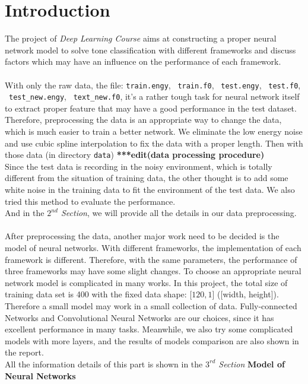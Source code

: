 \documentclass[12pt]{article}
\begin{document}
\section{Introduction}

The project of {\it Deep Learning Course} aims at constructing a proper neural network model to solve tone classification with different frameworks and discuss factors which may have an influence on the performance of each framework.\\
\\
With only the raw data, the file: \texttt{train.engy}, \  \texttt{train.f0}, \ \texttt{test.engy}, \ \texttt{test.f0},  \ \texttt{test\_new.engy}, \ \texttt{text\_new.f0}, it's a rather tough task for neural network itself to extract proper feature that may have a good performance in the test dataset. Therefore, preprocessing the data  is an appropriate way to change the data, which is much easier to train a better network. We eliminate the low energy noise and use cubic spline interpolation to fix the data with a proper length. Then with those data (in directory \texttt{data}) {\bf ****edit(data processing procedure)}\\
Since the test data is recording in the noisy environment, which is totally different from the situation of training data, the other thought is to add some white noise in the training data to fit the environment of the test data. We also tried this method to evaluate the performance.\\
And in the {\it $2^{nd}$ Section}, we will provide all the details in our data preprocessing.\\
\\
After preprocessing the data, another major work need to be decided is the model of neural networks. With different frameworks, the implementation of each framework is different. Therefore, with the same parameters, the performance of three frameworks may have some slight changes. To choose an appropriate neural network model is complicated in many works. In this project, the total size of training data set is 400 with the fixed data shape: [$120, 1$] ([width, height]). Therefore a small model may work in a small collection of data. Fully-connected Networks and Convolutional Neural Networks are our choices, since it has excellent performance in many tasks. Meanwhile, we also try some complicated models with more layers, and the results of models comparison are also shown in the report.\\
All the information details of this part is shown in the {\it $3^{rd}$ Section} {\bf Model of Neural Networks}\\
\end{document}
